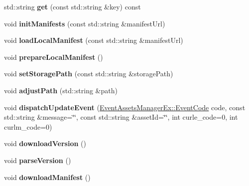 \begin{DoxyCompactItemize}
std\+::string {\bfseries get} (const std\+::string \&key) const
\item 
\mbox{\label{classAssetsManagerEx_acbddf0f0953d7edbd02774972bd409d2}} 
void {\bfseries init\+Manifests} (const std\+::string \&manifest\+Url)
\item 
\mbox{\label{classAssetsManagerEx_aa6f0e8cd27fbf4ba6212abd2a2c05c63}} 
void {\bfseries load\+Local\+Manifest} (const std\+::string \&manifest\+Url)
\item 
\mbox{\label{classAssetsManagerEx_a90058fdf24cf850439262ededaa0a521}} 
void {\bfseries prepare\+Local\+Manifest} ()
\item 
\mbox{\label{classAssetsManagerEx_a67700d2545ce476e3f3fa2f7e9bd5249}} 
void {\bfseries set\+Storage\+Path} (const std\+::string \&storage\+Path)
\item 
\mbox{\label{classAssetsManagerEx_a194bb3bc7dfec8cfada45a01dd3787be}} 
void {\bfseries adjust\+Path} (std\+::string \&path)
\item 
\mbox{\label{classAssetsManagerEx_abbad5dab755a0c53f46bc59bdeddc72a}} 
void {\bfseries dispatch\+Update\+Event} (\hyperlink{classEventAssetsManagerEx_ae48992cd906169f84a146e7ae8851cae}{Event\+Assets\+Manager\+Ex\+::\+Event\+Code} code, const std\+::string \&message=\char`\"{}\char`\"{}, const std\+::string \&asset\+Id=\char`\"{}\char`\"{}, int curle\+\_\+code=0, int curlm\+\_\+code=0)
\item 
\mbox{\label{classAssetsManagerEx_aa692723272d965b05bd60729856279fe}} 
void {\bfseries download\+Version} ()
\item 
\mbox{\label{classAssetsManagerEx_a8410062b500c6cdaf9d3634523333642}} 
void {\bfseries parse\+Version} ()
\item 
\mbox{\label{classAssetsManagerEx_aec0e59a5165b1d9387620a4beec027ac}} 
void {\bfseries download\+Manifest} ()
\item 
\mbox{\label{classAssetsManagerEx_addefe7c8c80a4455fb20b8a7436c1f00}} 

\end{DoxyCompactItemize}
